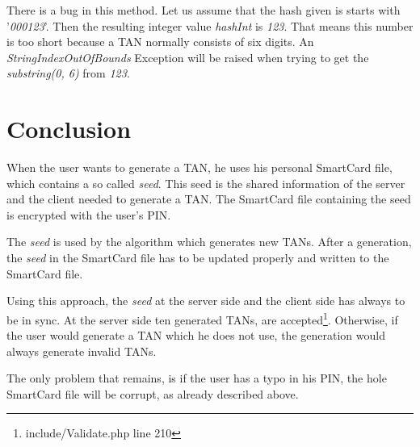 There is a bug in this method. Let us assume that the hash given is starts with '\textit{000123}'. Then the resulting integer value \textit{hashInt} is \textit{123}. That means this number is too short because a TAN normally consists of six digits. An \textit{StringIndexOutOfBounds} Exception will be raised when trying to get the \textit{substring(0, 6)} from \textit{123}.

\section{Conclusion}

When the user wants to generate a TAN, he uses his personal SmartCard file, which contains a so called \textit{seed}. This seed is the shared information of the server and the client needed to generate a TAN. The SmartCard file containing the seed is encrypted with the user's PIN.

The \textit{seed} is used by the algorithm which generates new TANs. After a generation, the \textit{seed} in the SmartCard file has to be updated properly and written to the SmartCard file.

Using this approach, the \textit{seed} at the server side and the client side has always to be in sync. At the server side ten generated TANs, are accepted\footnote{include/Validate.php line 210}. Otherwise, if the user would generate a TAN which he does not use, the generation would always generate invalid TANs.

The only problem that remains, is if the user has a typo in his PIN, the hole SmartCard file will be corrupt, as already described above.